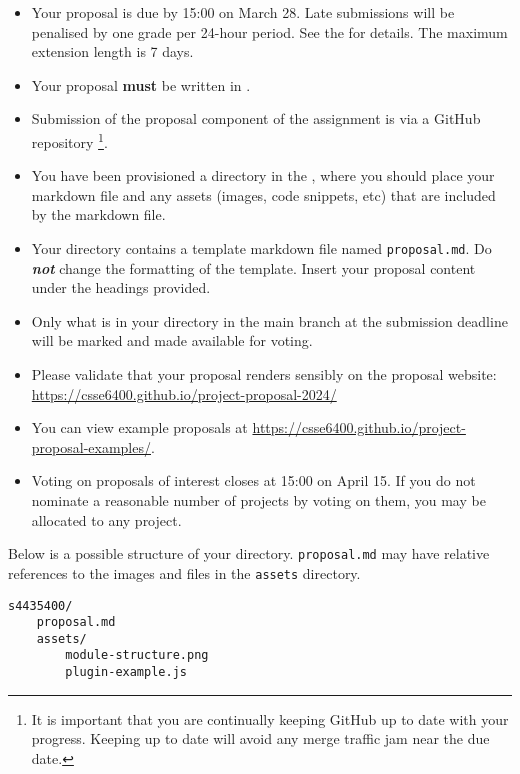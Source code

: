 \documentclass{csse4400}
\begin{document}
\begin{itemize}[topsep=4pt,partopsep=1pt,itemsep=5pt,parsep=2pt]
    \item Your proposal is due by 15:00 on March 28. Late submissions will be penalised by one grade per 24-hour period. See the  for details. The maximum extension length is 7 days.
    \item Your proposal \textbf{must} be written in .
    \item Submission of the proposal component of the assignment is via a GitHub repository%
             \footnote{It is important that you are continually keeping GitHub up to date with your progress.
              Keeping up to date will avoid any merge traffic jam near the due date.}.
    \item You have been provisioned a directory in the ,
          where you should place your markdown file and any assets (images, code snippets, etc) that are included by the markdown file.
    \item Your directory contains a template markdown file named \texttt{proposal.md}.
          Do \textbf{\textit{not}} change the formatting of the template.
          Insert your proposal content under the headings provided.
    \item Only what is in your directory in the main branch at the submission deadline will be marked and made available for voting.
    \item Please validate that your proposal renders sensibly on the proposal website:\\
        \url{https://csse6400.github.io/project-proposal-2024/}
    \item You can view example proposals at \url{https://csse6400.github.io/project-proposal-examples/}.
    \item Voting on proposals of interest closes at 15:00 on April 15.
          If you do not nominate a reasonable number of projects by voting on them, you may be allocated to any project.
\end{itemize}

\noindent
Below is a possible structure of your directory.
\texttt{proposal.md} may have relative references to the images and files in the \texttt{assets} directory.

\begin{verbatim}
s4435400/
    proposal.md
    assets/
        module-structure.png
        plugin-example.js
\end{verbatim}
\end{document}
